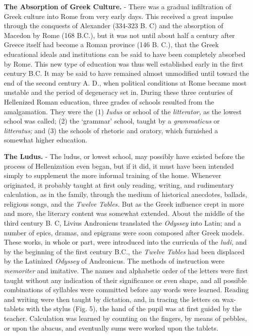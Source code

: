 \documentclass[]{book}
\begin{document}
\textbf{The Absorption of Greek Culture.} - There was a gradual infiltration of Greek culture into Rome from very early days. This received a great impulse through the conquests of Alexander (334-323 B. C) and the absorption of Macedon by Rome (168 B.C.), but it was not until about half a century after Greece itself had become a Roman province (146 B. C.), that the Greek educational ideals and institutions can be said to have been completely absorbed by Rome. This new type of education was thus well established early in the first century B.C. It may be said to have remained almost unmodified until toward the end of the second century A. D., when political conditions at Rome became most unstable and the period of degeneracy set in. During these three centuries of Hellenized Roman education, three grades of schools resulted from the amalgamation. They were the (1) \emph{Iudus} or school of the \emph{litterator,} as the lowest school was called; (2) the `grammar' school, taught by a \emph{grammaticus} or \emph{litteratus;} and (3) the schools of rhetoric and oratory, which furnished a somewhat higher education.

\textbf{The Ludus.} - The ludus, or lowest school, may possibly have existed before the process of Hellenization even began, but if it did, it must have been intended simply to supplement the more informal training of the home. Whenever originated, it probably taught at first only reading, writing, and rudimentary calculation, as in the family, through the medium of historical anecdotes, ballads, religious songs, and the \emph{Twelve Tables.} But as the Greek influence crept in more and more, the literary content was somewhat extended. About the middle of the third century B. C, Livius Andronicus translated the \emph{Odyssey} into Latin; and a number of epics, dramas, and epigrams were soon composed after Greek models. These works, in whole or part, were introduced into the curricula of the \emph{ludi,} and by the beginning of the first century B.C., the \emph{Twelve Tables} had been displaced by the Latinized \emph{Odyssey} of Andronicus. The methods of instruction were \emph{memoriter} and imitative. The names and alphabetic order of the letters were first taught without any indication of their significance or even shape, and all possible combinations of syllables were committed before any words were learned. Reading and writing were then taught by dictation, and, in tracing the letters on wax-tablets with the stylus (Fig. 5), the hand of the pupil was at first guided by the teacher. Calculation was learned by counting on the fingers, by means of pebbles, or upon the abacus, and eventually sums were worked upon the tablets.
\end{document}
